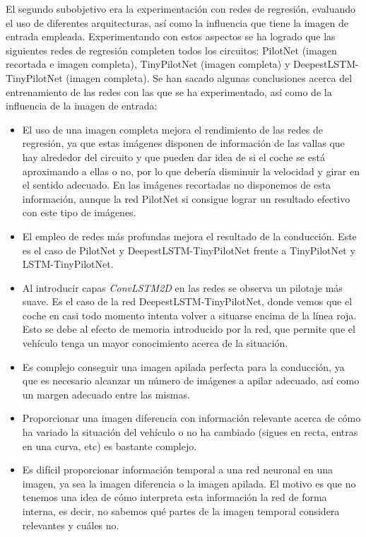 El segundo subobjetivo era la experimentación con redes de regresión, evaluando el uso de diferentes arquitecturas, así como la influencia que tiene la imagen de entrada empleada. Experimentando con estos aspectos se ha logrado que las siguientes redes de regresión completen todos los circuitos: PilotNet (imagen recortada e imagen completa), TinyPilotNet (imagen completa) y DeepestLSTM-TinyPilotNet (imagen completa). Se han sacado algunas conclusiones acerca del entrenamiento de las redes con las que se ha experimentado, así como de la influencia de la imagen de entrada:\\

\begin{itemize}
    \item El uso de una imagen completa mejora el rendimiento de las redes de regresión, ya que estas imágenes disponen de información de las vallas que hay alrededor del circuito y que pueden dar idea de si el coche se está aproximando a ellas o no, por lo que debería disminuir la velocidad y girar en el sentido adecuado. En las imágenes recortadas no disponemos de esta información, aunque la red PilotNet si consigue lograr un resultado efectivo con este tipo de imágenes.
    
    \item El empleo de redes más profundas mejora el resultado de la conducción. Este es el caso de PilotNet y DeepestLSTM-TinyPilotNet frente a TinyPilotNet y LSTM-TinyPilotNet.
    
    \item Al introducir capas \textit{ConvLSTM2D} en las redes se observa un pilotaje más suave. Es el caso de la red DeepestLSTM-TinyPilotNet, donde vemos que el coche en casi todo momento intenta volver a situarse encima de la línea roja. Esto se debe al efecto de memoria introducido por la red, que permite que el vehículo tenga un mayor conocimiento acerca de la situación.
    
    \item Es complejo conseguir una imagen apilada perfecta para la conducción, ya que es necesario alcanzar un número de imágenes a apilar adecuado, así como un margen adecuado entre las mismas.
    
    \item Proporcionar una imagen diferencia con información relevante acerca de cómo ha variado la situación del vehículo o no ha cambiado (sigues en recta, entras en una curva, etc) es bastante complejo.
    
    \item Es difícil proporcionar información temporal a una red neuronal en una imagen, ya sea la imagen diferencia o la imagen apilada. El motivo es que no tenemos una idea de cómo interpreta esta información la red de forma interna, es decir, no sabemos qué partes de la imagen temporal considera relevantes y cuáles no. 
\end{itemize}


